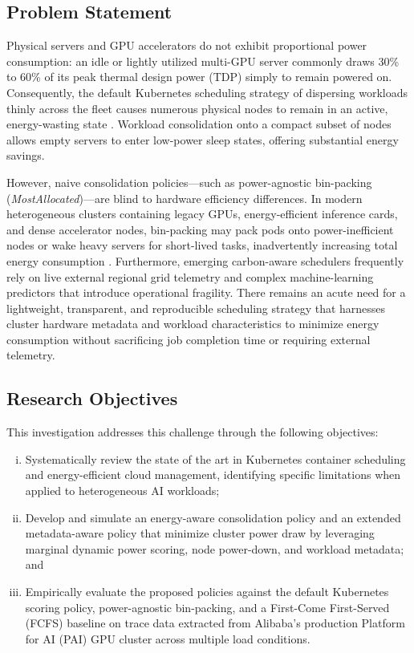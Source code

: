 \documentclass[a4paper,fleqn]{cas-dc}
\begin{document}
\subsection{Problem Statement}
Physical servers and GPU accelerators do not exhibit proportional power consumption: an idle or lightly utilized multi-GPU server commonly draws 30\% to 60\% of its peak thermal design power (TDP) simply to remain powered on. Consequently, the default Kubernetes scheduling strategy of dispersing workloads thinly across the fleet causes numerous physical nodes to remain in an active, energy-wasting state \citep{kocot2023energy,rao2025energy}. Workload consolidation onto a compact subset of nodes allows empty servers to enter low-power sleep states, offering substantial energy savings.

However, naive consolidation policies—such as power-agnostic bin-packing (\emph{MostAllocated})—are blind to hardware efficiency differences. In modern heterogeneous clusters containing legacy GPUs, energy-efficient inference cards, and dense accelerator nodes, bin-packing may pack pods onto power-inefficient nodes or wake heavy servers for short-lived tasks, inadvertently increasing total energy consumption \citep{zhong2020cost}. Furthermore, emerging carbon-aware schedulers \citep{gu2025greenflow,piontek2023carbon} frequently rely on live external regional grid telemetry and complex machine-learning predictors that introduce operational fragility. There remains an acute need for a lightweight, transparent, and reproducible scheduling strategy that harnesses cluster hardware metadata and workload characteristics to minimize energy consumption without sacrificing job completion time or requiring external telemetry.

\subsection{Research Objectives}
This investigation addresses this challenge through the following objectives:
\begin{enumerate}[(i)]
    \item Systematically review the state of the art in Kubernetes container scheduling and energy-efficient cloud management, identifying specific limitations when applied to heterogeneous AI workloads;
    \item Develop and simulate an energy-aware consolidation policy and an extended metadata-aware policy that minimize cluster power draw by leveraging marginal dynamic power scoring, node power-down, and workload metadata; and
    \item Empirically evaluate the proposed policies against the default Kubernetes scoring policy, power-agnostic bin-packing, and a First-Come First-Served (FCFS) baseline on trace data extracted from Alibaba's production Platform for AI (PAI) GPU cluster across multiple load conditions.
\end{enumerate}
\end{document}
